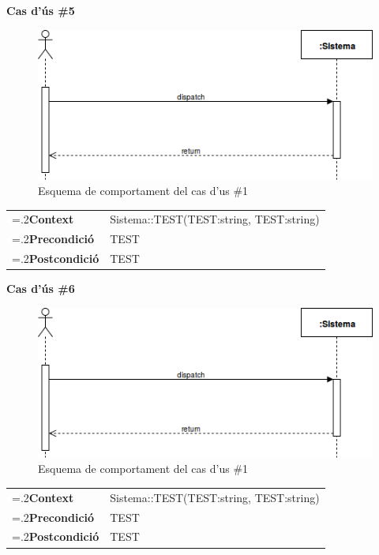\clearpage
\noindent\textbf{\large Cas d'ús \#5}\\
\begin{figure}[H]
\centering
\includegraphics[scale=0.6]{Figures/casdus_00.png}
\caption{Esquema de comportament del cas d'us \#1}
\end{figure}
\begin{table}[h]
\noindent
\begin{tabularx}{\linewidth}{
>{\hsize=.2\hsize}X%
>{\hsize=0.8\hsize}X%
}
\textbf{Context} 		& Sistema::TEST(TEST:string, TEST:string) \\
\textbf{Precondició} 	& TEST \\
\textbf{Postcondició}	& TEST \\
\end{tabularx}
\label{}
\end{table}

\noindent\textbf{\large Cas d'ús \#6}\\
\begin{figure}[H]
\centering
\includegraphics[scale=0.6]{Figures/casdus_00.png}
\caption{Esquema de comportament del cas d'us \#1}
\end{figure}
\begin{table}[h]
\noindent
\begin{tabularx}{\linewidth}{
>{\hsize=.2\hsize}X%
>{\hsize=0.8\hsize}X%
}
\textbf{Context} 		& Sistema::TEST(TEST:string, TEST:string) \\
\textbf{Precondició} 	& TEST \\
\textbf{Postcondició}	& TEST \\
\end{tabularx}
\label{}
\end{table}

